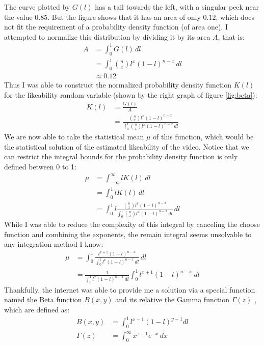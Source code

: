\documentclass[a4paper,11pt]{article}
\begin{document}
The curve plotted by $G(l)$ has a tail towards the left, with a singular peek near the value $0.85$. But the figure shows that it has an area of only $0.12$, which does not fit the requirement of a probability density function (of area one). I attempted to normalize this distribution by dividing it by its area $A$, that is:
\begin{align*}
    A &= \int_{0}^{1} G(l) \, dl\\
    &= \int_{0}^{1} {n \choose x} l^x (1-l)^{n-x} \, dl\\
    &\approx 0.12
\end{align*}
Thus I was able to construct the normalized probability density function $K(l)$ for the likeability random variable (shown by the right graph of figure \ref{fig:beta}):
\begin{align*}
    K(l) &= \frac{G(l)}{A}\\
    &= \frac{ {n \choose x} l^x (1-l)^{n-x}} {\int_{0}^{1} {n \choose x} l^x (1-l)^{n-x} \, dl}
\end{align*}
We are now able to take the statistical mean $\mu$ of this function, which would be the statistical solution of the estimated likeability of the video. Notice that we can restrict the integral bounds for the probability density function is only defined between 0 to 1:
\begin{align*}
    \mu &= \int_{-\infty}^{\infty} l K(l) \, dl\\
    &=\int_{0}^{1} l K(l) \, dl\\
    &=\int_{0}^{1} l \frac{ {n \choose x} l^x (1-l)^{n-x}} {\int_{0}^{1} {n \choose x} l^x (1-l)^{n-x} \, dl} \, dl
\end{align*}
While I was able to reduce the complexity of this integral by canceling the choose function and combining the exponents, the remain integral seems unsolvable to any integration method I know:
\begin{align*}
    \mu &=\int_{0}^{1} \frac{ l^{x+1} (1-l)^{n-x}} {\int_{0}^{1} l^x (1-l)^{n-x} \, dl} \, dl\\
    &= \frac{1}{\int_{0}^{1} l^x (1-l)^{n-x} \, dl} \int_{0}^{1}  l^{x+1} (1-l)^{n-x} \, dl
\end{align*}
Thankfully, the internet was able to provide me a solution via a special function named the Beta function $B(x,y)$ \parencite{wikipedia_2021} and its relative the Gamma function $\Gamma(z)$ \parencite{artin_2006}, which are defined as:
\begin{align*}
    B(x, y) &= \int_{0}^{1} l^{x-1} (1-l)^{y-1} dl\\
    \Gamma(z) &= \int_{0}^{\infty} x^{z-1} e^{-x} \, dx
\end{align*}
\end{document}
